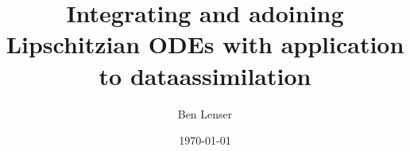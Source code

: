 \documentclass[
	12pt,
	a4paper,
	twoside,
	titlepage,
	parskip=half,
	BCOR=10mm,
	bibliography=totoc,
	headings=normal,
	DIV=calc,
 	draft
]{scrreprt}
\begin{document}
\author{Ben Lenser}
\title{Integrating and adoining Lipschitzian ODEs with application to dataassimilation}

\date{\today}

  

\cleardoublepage
{}

% 











\begin{spacing}{1}
 \printbibliography
\end{spacing}

\appendix





\end{document}

